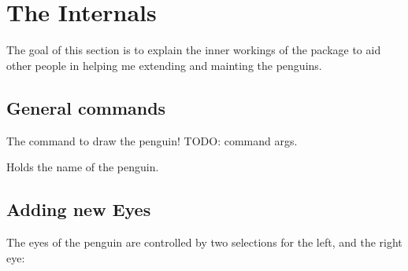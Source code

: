 \documentclass[parskip=half,english,numbers=noenddot,footnotes=nomultiple,oneside]{scrartcl}
\makeatletter
\def\explaincolor{@opcolor!8!white}
\def\keyexplainindent{2.5em}%
\let\@labelhack\@empty
\newenvironment{commandexplain}[1]{%
\begingroup
\def\@labelhack{/pingu/}%
\def\explaincolor{@softexplaincolor}\def\keyexplainindent{0em}%
\keyexplain[]{\\#1}{}{}%
}{\endkeyexplain\endgroup}
\makeatother
\begin{document}



\newcommand\includecode[2][../tex/tikzpingus.sty]{}

\section{The Internals}
The goal of this section is to explain the inner workings of the package to aid other people in helping me extending and mainting the penguins.

\subsection{General commands}
\begin{commandexplain}{pingu}
	The command to draw the penguin! TODO: command args.
\end{commandexplain}

\begin{commandexplain}{pingu@name}
	Holds the name of the penguin.
\end{commandexplain}

\subsection{Adding new Eyes}
The eyes of the penguin are controlled by two selections for the left, and the right eye:
\includecode{eyes\ selectors}


\lstset{breakatwhitespace}\printindex
\end{document}
